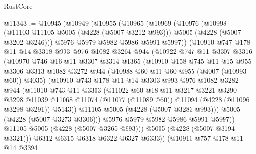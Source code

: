 \begin{lexlean}{RustCore}
\begin{coremodule}
@11343 := @10945
    (@10949
      (@10955
        (@10965
          (@10969
            (@10976
              (@10998
                (@11103 @11105 @5005 (@4228 (@5007 @3212 @993)))
                @5005
                (@4228 (@5007 @3202 @3246)))
              @5976
              @5979
              @5982
              @5986
              @5991
              @5997))
          (@10910
            @747
            @178
            @11
            @14
            @3318
            @993
            @976
            @1082
            @3264
            @944
            (@10922
              @747
              @11
              @3307
              @3316
              (@10970
                @746
                @16
                @11
                @3307
                @3314
                @1365
                (@10910
                  @158
                  @745
                  @11
                  @15
                  @955
                  @3306
                  @3313
                  @1082
                  @3272
                  @944
                  (@10988 @60 @11 @60 @955 (@4007 (@10993 @60)) @4035)
                  (@10910
                    @743
                    @178
                    @11
                    @14
                    @3303
                    @993
                    @976
                    @1082
                    @3282
                    @944
                    (@11010
                      @743
                      @11
                      @3303
                      (@11022
                        @60
                        @18
                        @11
                        @3217
                        @3221
                        @3290
                        @3298
                        @11039
                        @11068
                        @11074
                        (@11077 (@11089 @60))
                        @11094
                        (@4228 (@11096 @3298 @3291))
                        @5143))
                    @11105
                    @5005
                    (@4228 (@5007 @3283 @993)))
                  @5005
                  (@4228 (@5007 @3273 @3306)))
                @5976
                @5979
                @5982
                @5986
                @5991
                @5997))
            @11105
            @5005
            (@4228 (@5007 @3265 @993)))
          @5005
          (@4228 (@5007 @3194 @3321)))
        @6312
        @6315
        @6318
        @6322
        @6327
        @6333))
    (@10910
      @757
      @178
      @11
      @14
      @3394

\end{coremodule}
\end{lexlean}
